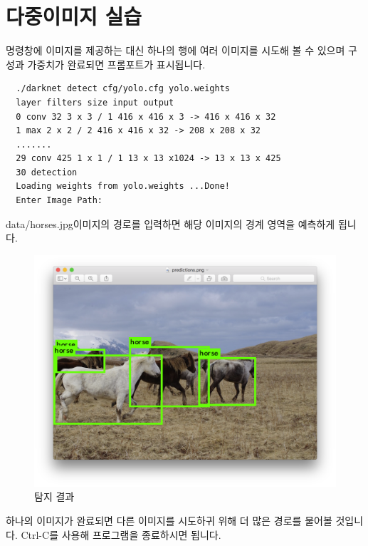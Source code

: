 \documentclass{article}
\begin{document}
\section{다중이미지 실습}
명령창에 이미지를 제공하는 대신 하나의 행에 여러 이미지를 시도해 볼 수 있으며 구성과 가중치가 완료되면 프롬포트가 표시됩니다.
\begin{lstlisting}
  ./darknet detect cfg/yolo.cfg yolo.weights 
  layer filters size input output 
  0 conv 32 3 x 3 / 1 416 x 416 x 3 -> 416 x 416 x 32 
  1 max 2 x 2 / 2 416 x 416 x 32 -> 208 x 208 x 32 
  ....... 
  29 conv 425 1 x 1 / 1 13 x 13 x1024 -> 13 x 13 x 425 
  30 detection 
  Loading weights from yolo.weights ...Done! 
  Enter Image Path: 
\end{lstlisting}
data/horses.jpg이미지의 경로를 입력하면 해당 이미지의 경계 영역을 예측하게 됩니다.
\begin{figure}[h!]
\centering
\includegraphics[scale=0.2]{horse.png}
\caption{탐지 결과}
\label{fig:horseresult}
\end{figure}
하나의 이미지가 완료되면 다른 이미지를 시도하귀 위해 더 많은 경로를 물어볼 것입니다.
Ctrl-C를 사용해 프로그램을 종료하시면 됩니다.
\end{document}
